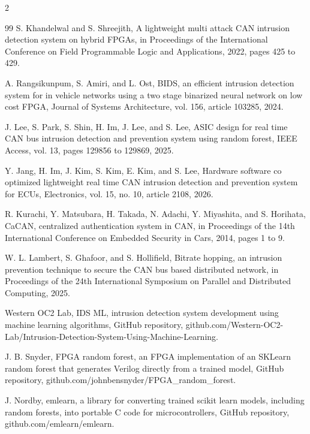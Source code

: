 \documentclass[11pt]{article}
\begin{document}
\begin{multicols}{2}
\begin{thebibliography}{99}
S. Khandelwal and S. Shreejith, A lightweight multi attack CAN intrusion detection system on hybrid FPGAs, in Proceedings of the International Conference on Field Programmable Logic and Applications, 2022, pages 425 to 429.

A. Rangsikunpum, S. Amiri, and L. Ost, BIDS, an efficient intrusion detection system for in vehicle networks using a two stage binarized neural network on low cost FPGA, Journal of Systems Architecture, vol. 156, article 103285, 2024.

J. Lee, S. Park, S. Shin, H. Im, J. Lee, and S. Lee, ASIC design for real time CAN bus intrusion detection and prevention system using random forest, IEEE Access, vol. 13, pages 129856 to 129869, 2025.

Y. Jang, H. Im, J. Kim, S. Kim, E. Kim, and S. Lee, Hardware software co optimized lightweight real time CAN intrusion detection and prevention system for ECUs, Electronics, vol. 15, no. 10, article 2108, 2026.

R. Kurachi, Y. Matsubara, H. Takada, N. Adachi, Y. Miyashita, and S. Horihata, CaCAN, centralized authentication system in CAN, in Proceedings of the 14th International Conference on Embedded Security in Cars, 2014, pages 1 to 9.

W. L. Lambert, S. Ghafoor, and S. Hollifield, Bitrate hopping, an intrusion prevention technique to secure the CAN bus based distributed network, in Proceedings of the 24th International Symposium on Parallel and Distributed Computing, 2025.

Western OC2 Lab, IDS ML, intrusion detection system development using machine learning algorithms, GitHub repository, github.com/Western-OC2-Lab/Intrusion-Detection-System-Using-Machine-Learning.

J. B. Snyder, FPGA random forest, an FPGA implementation of an SKLearn random forest that generates Verilog directly from a trained model, GitHub repository, github.com/johnbensnyder/FPGA\_random\_forest.

J. Nordby, emlearn, a library for converting trained scikit learn models, including random forests, into portable C code for microcontrollers, GitHub repository, github.com/emlearn/emlearn.

\end{thebibliography}
\end{multicols}
\end{document}
